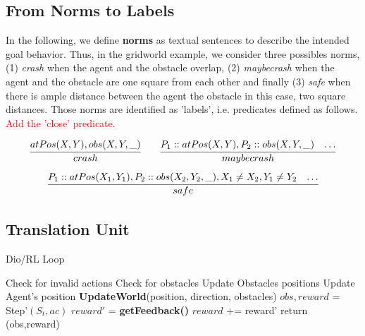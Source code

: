 \subsection{From Norms to Labels}
In the following, we define \textbf{norms} as textual sentences to describe the intended goal behavior. 
Thus, in the gridworld example, we consider three possibles norms, (1) \textit{crash} when the agent and the obstacle overlap, (2) \textit{maybecrash} 
when the agent and the obstacle are one square from each other and finally (3) \textit{safe} when there is ample distance between the agent the obstacle 
in this case, two square distances. Those norms are identified as 'labels', i.e. predicates defined as follows. 
\textcolor{red}{Add the 'close' predicate}.

\[
    \infer{crash}{atPos(X,Y), obs(X,Y,\_)} 
    \qquad
    \infer{maybecrash}{P_1::atPos(X,Y), P_2::obs(X,Y,\_)
      & \ldots}
\] 
\[
    \infer{safe}{
      P_1::atPos(X_1,Y_1), P_2::obs(X_2,Y_2,\_),X_1 \neq X_2, Y_1 \neq Y_2
      & \ldots
    }
\]
 

\subsection{Translation Unit}

  \begin{algorithm}[H]
    \caption{Dio/RL Loop}
    \begin{algorithmic}[1]
    
           
        \State Check for invalid actions
        \State Check for obstacles 
        \State Update Obstacles positions
        \State Update Agent's position
        \State \textbf{UpdateWorld}(position, direction, obstacles) 
        \State $obs, reward$ = Step'$(S_t, ac)$ 
        \State $reward'$ = \textbf{getFeedback()} 
            \State $reward$ += reward'
        \EndIf
        \State return (obs,reward)
    \EndProcedure
    
    \end{algorithmic}
    \end{algorithm}


